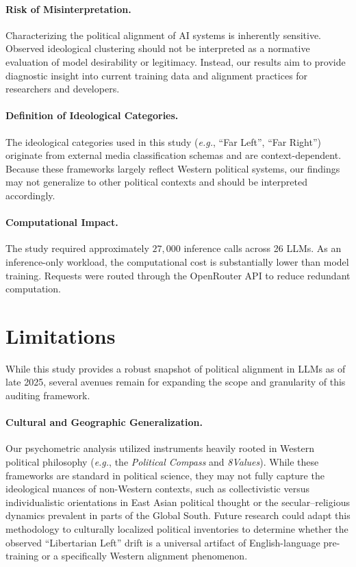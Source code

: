 \documentclass[11pt]{article}
\begin{document}
\paragraph{Risk of Misinterpretation.}
Characterizing the political alignment of AI systems is inherently sensitive. Observed ideological clustering should not be interpreted as a normative evaluation of model desirability or legitimacy. Instead, our results aim to provide diagnostic insight into current training data and alignment practices for researchers and developers.

\paragraph{Definition of Ideological Categories.}
The ideological categories used in this study (\textit{e.g.}, ``Far Left'', ``Far Right'') originate from external media classification schemas and are context-dependent. Because these frameworks largely reflect Western political systems, our findings may not generalize to other political contexts and should be interpreted accordingly.

\paragraph{Computational Impact.}
The study required approximately $27{,}000$ inference calls across 26 LLMs. As an inference-only workload, the computational cost is substantially lower than model training. Requests were routed through the OpenRouter API to reduce redundant computation.



\section{Limitations}
\label{sec:limitations}

While this study provides a robust snapshot of political alignment in LLMs as of late 2025, several avenues remain for expanding the scope and granularity of this auditing framework.

\paragraph{Cultural and Geographic Generalization.}
Our psychometric analysis utilized instruments heavily rooted in Western political philosophy (\textit{e.g.}, the \textit{Political Compass} and \textit{8Values}). While these frameworks are standard in political science, they may not fully capture the ideological nuances of non-Western contexts, such as collectivistic versus individualistic orientations in East Asian political thought or the secular--religious dynamics prevalent in parts of the Global South. Future research could adapt this methodology to culturally localized political inventories to determine whether the observed ``Libertarian Left'' drift is a universal artifact of English-language pre-training or a specifically Western alignment phenomenon.
\end{document}
